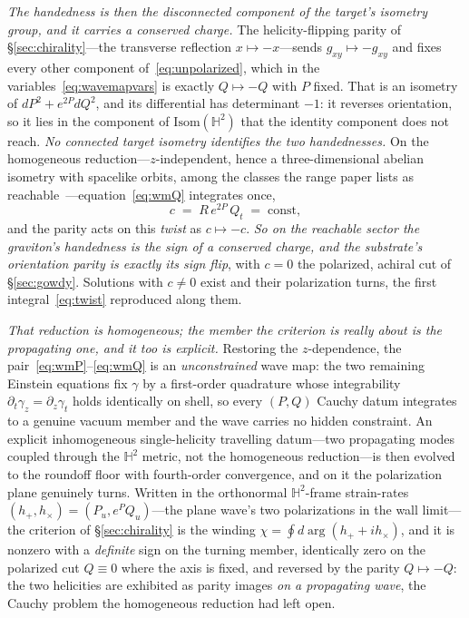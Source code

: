 \documentclass[11pt,a4paper]{article}
\theoremstyle{plain}
\theoremstyle{definition}
\theoremstyle{remark}
\begin{document}
\emph{The handedness is then the disconnected component of the target's isometry group, and it carries a conserved charge.} The helicity-flipping parity of \S\ref{sec:chirality}---the transverse reflection $x\mapsto-x$---sends $g_{xy}\mapsto-g_{xy}$ and fixes every other component of~\eqref{eq:unpolarized}, which in the variables~\eqref{eq:wavemapvars} is exactly $Q\mapsto-Q$ with $P$ fixed. That is an isometry of $dP^2+e^{2P}dQ^2$, and its differential has determinant $-1$: it reverses orientation, so it lies in the component of $\mathrm{Isom}(\mathbb{H}^2)$ that the identity component does not reach. \emph{No connected target isometry identifies the two handednesses.} On the homogeneous reduction---$z$-independent, hence a three-dimensional abelian isometry with spacelike orbits, among the classes the range paper lists as reachable~\cite{JanzenRange}---equation~\eqref{eq:wmQ} integrates once,
\begin{equation}\label{eq:twist}
c \;=\; R\,e^{2P}\,Q_t \;=\; \text{const},
\end{equation}
and the parity acts on this \emph{twist} as $c\mapsto-c$. \emph{So on the reachable sector the graviton's handedness is the sign of a conserved charge, and the substrate's orientation parity is exactly its sign flip}, with $c=0$ the polarized, achiral cut of \S\ref{sec:gowdy}. Solutions with $c\neq0$ exist and their polarization turns, the first integral~\eqref{eq:twist} reproduced along them.

\emph{That reduction is homogeneous; the member the criterion is really about is the propagating one, and it too is explicit.} Restoring the $z$-dependence, the pair~\eqref{eq:wmP}--\eqref{eq:wmQ} is an \emph{unconstrained} wave map: the two remaining Einstein equations fix $\gamma$ by a first-order quadrature whose integrability $\partial_t\gamma_z=\partial_z\gamma_t$ holds identically on shell, so every $(P,Q)$ Cauchy datum integrates to a genuine vacuum member and the wave carries no hidden constraint. An explicit inhomogeneous single-helicity travelling datum---two propagating modes coupled through the $\mathbb{H}^2$ metric, not the homogeneous reduction---is then evolved to the roundoff floor with fourth-order convergence, and on it the polarization plane genuinely turns. Written in the orthonormal $\mathbb{H}^2$-frame strain-rates $(h_+,h_\times)=(P_u,e^{P}Q_u)$---the plane wave's two polarizations in the wall limit---the criterion of \S\ref{sec:chirality} is the winding $\chi=\oint d\arg(h_++ih_\times)$, and it is nonzero with a \emph{definite} sign on the turning member, identically zero on the polarized cut $Q\equiv0$ where the axis is fixed, and reversed by the parity $Q\mapsto-Q$: the two helicities are exhibited as parity images \emph{on a propagating wave}, the Cauchy problem the homogeneous reduction had left open.
\end{document}
